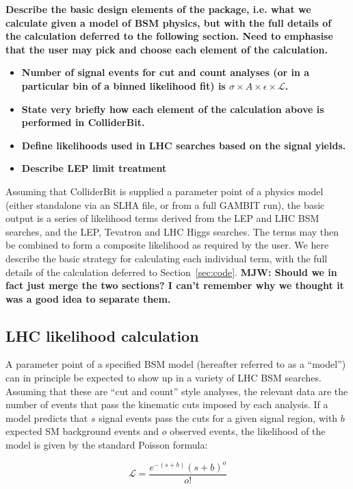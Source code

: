 \textbf{Describe the basic design elements of the package, i.e. what we calculate given a model of BSM physics, but with the full details of the calculation deferred to the following section. Need to emphasise that the user may pick and choose each element of the calculation.}

\begin{itemize}
\item \textbf{Number of signal events for cut and count analyses (or in a particular bin of a binned likelihood fit) is $\sigma \times A \times \epsilon \times \mathcal{L}$.}
\item \textbf{State very briefly how each element of the calculation above is performed in ColliderBit.}
\item \textbf{Define likelihoods used in LHC searches based on the signal yields.}
\item \textbf{Describe LEP limit treatment}
\end{itemize}

Assuming that ColliderBit is supplied a parameter point of a physics model (either standalone via an SLHA file, or from a full GAMBIT run), the basic output is a series of likelihood terms derived from the LEP and LHC BSM searches, and the LEP, Tevatron and LHC Higgs searches. The terms may then be combined to form a composite likelihood as required by the user. We here describe the basic strategy for calculating each individual term, with the full details of the calculation deferred to Section~\ref{sec:code}. \textbf{MJW: Should we in fact just merge the two sections? I can't remember why we thought it was a good idea to separate them.} 

\subsection{LHC likelihood calculation}
A parameter point of a specified BSM model (hereafter referred to as a ``model'') can in principle be expected to show up in a variety of LHC BSM searches. Assuming that these are ``cut and count'' style analyses, the relevant data are the number of events that pass the kinematic cuts imposed by each analysis. If a model predicts that $s$ signal events pass the cuts for a given signal region, with $b$ expected SM background events and $o$ observed events, the likelihood of the model is given by the standard Poisson formula:

\begin{equation}
\mathcal{L}=\frac{e^{-(s+b)}(s+b)^o}{o!}
\end{equation}

